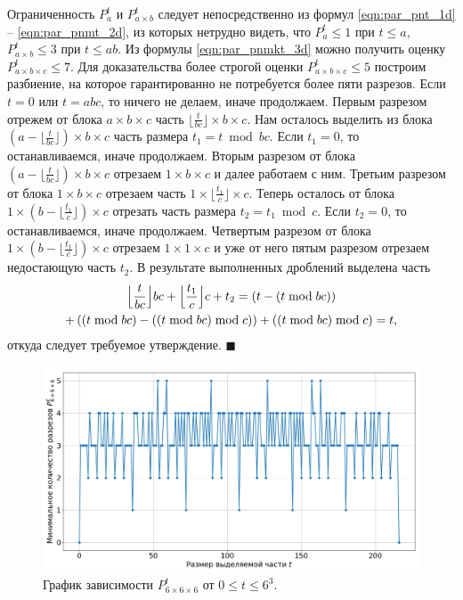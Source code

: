 Ограниченность $P_a^t$ и $P_{a \times b}^t$ следует непосредственно из формул \eqref{eqn:par_pnt_1d} -- \eqref{eqn:par_pnmt_2d}, из которых нетрудно видеть, что $P_a^t \le 1$ при $t \le a$, $P_{a \times b}^t \le 3$ при $t \le ab$.
Из формулы \eqref{eqn:par_pnmkt_3d} можно получить оценку $P_{a \times b \times c}^t \le 7$.
Для доказательства более строгой оценки $P_{a \times b \times c}^t \le 5$ построим разбиение, на которое гарантированно не потребуется более пяти разрезов.
Если $t = 0$ или $t = abc$, то ничего не делаем, иначе продолжаем.
Первым разрезом отрежем от блока $a \times b \times c$ часть $\lfloor \frac{t}{bc} \rfloor \times b \times c$.
Нам осталось выделить из блока $\left(a - \lfloor \frac{t}{bc} \rfloor\right) \times b \times c$ часть размера $t_1 = t \bmod bc$.
Если $t_1 = 0$, то останавливаемся, иначе продолжаем.
Вторым разрезом от блока $\left(a - \lfloor \frac{t}{bc} \rfloor\right) \times b \times c$ отрезаем $1 \times b \times c$ и далее работаем с ним.
Третьим разрезом от блока $1 \times b \times c$ отрезаем часть $1 \times \lfloor \frac{t_1}{c} \rfloor \times c$.
Теперь осталось от блока $1 \times \left( b - \lfloor \frac{t_1}{c} \rfloor \right) \times c$ отрезать часть размера $t_2 = t_1 \bmod c$.
Если $t_2 = 0$, то останавливаемся, иначе продолжаем.
Четвертым разрезом от блока $1 \times \left( b - \lfloor \frac{t_1}{c} \rfloor \right) \times c$ отрезаем $1 \times 1 \times c$ и уже от него пятым разрезом отрезаем недостающую часть $t_2$.
В результате выполненных дроблений выделена часть
\begin{multline}
	\Bigl \lfloor \frac{t}{bc} \Bigr \rfloor bc + \Bigl \lfloor \frac{t_1}{c} \Bigr \rfloor c + t_2 =
	\left(t - (t \bmod bc)\right) \\ + \left((t \bmod bc) - ((t \bmod bc) \bmod c)\right) + ((t \bmod bc) \bmod c) = t,
\end{multline}
откуда следует требуемое утверждение.
$\blacksquare$\\

\begin{figure}[ht]
\centering
\includegraphics[width=1.0\textwidth]{fig/par_min_cuts_for_extract_part_chart.png}
\singlespacing
{}\caption{График зависимости $P_{6 \times 6 \times 6}^t$ от $0 \le t \le 6^3$.}
\label{fig:par_pnmkt_chart}
\end{figure}

